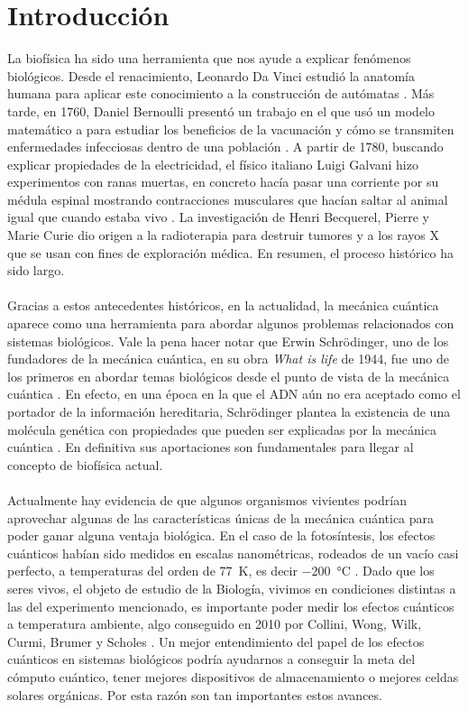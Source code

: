 \documentclass[letterpaper,12pt,oneside]{book}
\begin{document}
\tableofcontents


\newpage


\section{Introducci\'on }
La biof\'isica ha sido una herramienta que nos ayude a explicar fen\'omenos biol\'ogicos.  
%
Desde el renacimiento, Leonardo Da Vinci estudi\'o la anatom\'ia humana para aplicar este conocimiento a la construcci\'on de aut\'omatas \cite{DaVinci}.  
%
M\'as tarde, en 1760, Daniel Bernoulli present\'o un trabajo en el que us\'o un modelo matem\'atico a para estudiar los beneficios de la vacunaci\'on y c\'omo se transmiten enfermedades infecciosas dentro de una poblaci\'on \cite{Bernoulli}. 
%
A partir de 1780, buscando explicar propiedades de la electricidad, el f\'isico italiano Luigi Galvani hizo experimentos con ranas muertas, en concreto hac\'ia pasar una corriente por su m\'edula espinal mostrando contracciones musculares que hac\'ian saltar al animal igual que cuando estaba vivo \cite{Galvani}. 
%
La investigaci\'on de Henri Becquerel, Pierre y Marie Curie dio origen a la radioterapia para destruir tumores y a los rayos X que se usan con fines de exploraci\'on m\'edica. En resumen, el proceso hist\'orico ha sido largo.
%
\\
\\
Gracias a estos antecedentes hist\'oricos, en la actualidad, la mec\'anica cu\'antica aparece como  una herramienta para  abordar algunos problemas relacionados con sistemas biol\'ogicos. 
%
Vale la pena hacer notar que Erwin Schr\"odinger, uno de los fundadores de la mec\'anica cu\'antica,  en su obra \textit{What is life} de 1944, fue  uno de los primeros en abordar temas biol\'ogicos desde el punto de vista de la mec\'anica cu\'antica \cite{ES}. En efecto,  en una \'epoca en la que el ADN a\'un no era aceptado como el portador de la informaci\'on hereditaria, Schr\"odinger plantea la existencia de una mol\'ecula gen\'etica con propiedades que pueden ser explicadas por la mec\'anica cu\'antica \cite{ES}. En definitiva sus aportaciones son fundamentales para llegar al concepto de biof\'isica actual.\\
%
\\
Actualmente hay evidencia de que algunos organismos vivientes podr\'ian aprovechar algunas de las caracter\'isticas \'unicas de la mec\'anica cu\'antica para poder ganar alguna ventaja biol\'ogica.
%
En el caso de la fotos\'intesis, los efectos cu\'anticos hab\'ian sido medidos en escalas nanom\'etricas, rodeados de un vac\'io casi perfecto, a temperaturas  del orden de \SI{77}{\kelvin},  es decir \SI{-200}{\celsius}  \cite{engel}. Dado que los seres vivos, el objeto de estudio de la Biolog\'ia, vivimos en condiciones distintas a las del experimento mencionado, es importante poder medir los efectos cu\'anticos a temperatura ambiente, algo conseguido en 2010 por Collini, Wong, Wilk, Curmi, Brumer y Scholes \cite{collini}. Un mejor entendimiento del papel de los efectos cu\'anticos en sistemas biol\'ogicos podr\'ia ayudarnos a conseguir la meta del c\'omputo cu\'antico, tener mejores dispositivos de almacenamiento o mejores celdas solares org\'anicas. Por esta raz\'on son tan importantes estos avances.
\end{document}
